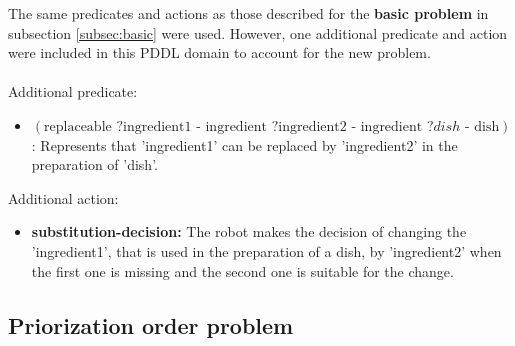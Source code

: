 The same predicates and actions as those described for the \textbf{basic problem} in subsection \ref{subsec:basic} were used. 
However, one additional predicate and action were included in this PDDL domain to account for the new problem.
\\ \\ 
Additional predicate:
\begin{itemize}
  \item $ (\text{replaceable } ? \text{ingredient1 - ingredient }  ? \text{ingredient2 - ingredient }  ?dish  \text{ - dish}) $: Represents that 'ingredient1' can be replaced by 'ingredient2' in the preparation of 'dish'.
\end{itemize}
Additional action:
\begin{itemize}
  \item \textbf{substitution-decision:} The robot makes the decision of changing the 'ingredient1', that is used in the preparation of 
  a dish, by 'ingredient2' when the first one is missing and the second one is suitable for the change.
\end{itemize}

\subsection{Priorization order problem}
